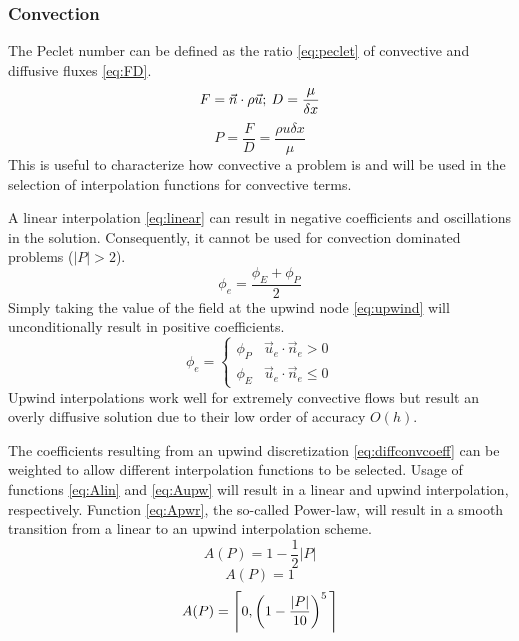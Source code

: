 \documentclass[12pt,twocolumn]{article}
\begin{document}
\subsubsection*{Convection}
The Peclet number can be defined as the ratio \eqref{eq:peclet} of convective and diffusive fluxes \eqref{eq:FD}.
\begin{equation}\label{eq:FD}F=\vec n\cdot\rho\vec u;\hspace{.5ex}D=\frac{\mu}{\delta x}\end{equation} %
\begin{equation}\label{eq:peclet}P = \frac{F}{D} = \frac{\rho u \delta x}{\mu}\end{equation}
This is useful to characterize how convective a problem is and will be used in the selection of interpolation functions for convective terms.

A linear interpolation \eqref{eq:linear} can result in negative coefficients and oscillations in the solution. Consequently, it cannot be used for convection dominated problems ($|P|>2$).
\begin{equation}\label{eq:linear}\phi_e = \frac{\phi_E + \phi_P}{2}\end{equation}
Simply taking the value of the field at the upwind node \eqref{eq:upwind} will unconditionally result in positive coefficients.
\begin{equation}\label{eq:upwind}\phi_e = \begin{cases}\phi_P & \vec u_e \cdot \vec n_e > 0\\\phi_E &\vec u_e \cdot \vec n_e \leq 0\end{cases}\end{equation}
Upwind interpolations work well for extremely convective flows but result an overly diffusive solution due to their low order of accuracy $O(h)$.

The coefficients resulting from an upwind discretization \eqref{eq:diffconvcoeff} can be weighted to allow different interpolation functions to be selected.
Usage of functions \eqref{eq:Alin} and \eqref{eq:Aupw} will result in a linear and upwind interpolation, respectively.
Function \eqref{eq:Apwr}, the so-called Power-law, will result in a smooth transition from a linear to an upwind interpolation scheme.
\begin{equation}\label{eq:Alin}A(P) = 1 - \frac 1 2 |P|\end{equation}
\begin{equation}\label{eq:Aupw}A(P) = 1\end{equation}
\begin{equation}\label{eq:Apwr}A(P) = \left\lceil 0, \left(1-\frac{|P|}{10}\right)^5 \hspace{.3ex}\right\rceil\end{equation}
\end{document}
